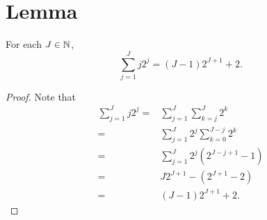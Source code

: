 \documentclass[12pt]{article}
\begin{document}
\section{Lemma}

\begin{lemma}\label{lem:sumjtwotothepowerj}
   For each $J\in \operatorname{\mathbb{N}}$,  \[
    \sum_{j=1}^Jj2^j=(J-1)2^{J+1} + 2. 
    \]
\end{lemma}
\begin{proof}
    Note that 
    \begin{align*}
    \sum_{j=1}^J j2^j =&\sum_{j=1}^J \sum_{k=j}^J2^k\\
    = & \sum_{j=1}^J 2^j\sum_{k=0}^{J-j}2^k \\
    = & \sum_{j=1}^J 2^j (2^{J-j+1}-1)\\
    = & J2^{J+1} - (2^{J+1}-2)\\  
    = & (J-1)2^{J+1} + 2.
\end{align*}

\end{proof}
\end{document}
